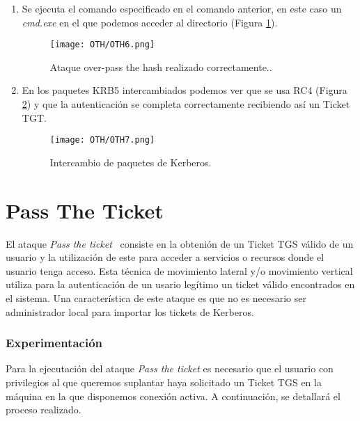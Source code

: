 \begin{enumerate}
\item Se ejecuta el comando especificado en el comando anterior, en este caso un {\it cmd.exe} en el que podemos acceder al directorio (Figura \ref{OTH6}).
\begin{figure}[H] %
\begin{center}
\texttt{[image: OTH/OTH6.png]}
\end{center}
\caption{Ataque over-pass the hash realizado correctamente..}
\label{OTH6}
\end{figure}

\item En los paquetes KRB5 intercambiados podemos ver que se usa RC4 (Figura \ref{OTH7}) y que la autenticación se completa correctamente recibiendo así un Ticket TGT. 
\begin{figure}[H] %
\begin{center}
\texttt{[image: OTH/OTH7.png]}
\end{center}
\caption{Intercambio de paquetes de Kerberos.}
\label{OTH7}
\end{figure}


\end{enumerate}

\section{Pass The Ticket}

El ataque {\it Pass the ticket}~\cite{Capitulo5:ptt} consiste en la obtenión de un Ticket TGS válido de un usuario y la utilización de este para acceder a servicios o recursos donde el usuario tenga acceso. Esta técnica de movimiento lateral y/o movimiento vertical utiliza para la autenticación de un usario legítimo un ticket válido encontrados en el sistema. Una característica de este ataque es que no es necesario ser administrador local para importar los tickets de Kerberos.  

\subsubsection{Experimentación}

Para la ejecutación del ataque {\it Pass the ticket} es necesario que el usuario con privilegios al que queremos suplantar haya solicitado un Ticket TGS en la máquina en la que disponemos conexión activa. A continuación, se detallará el proceso realizado. 

